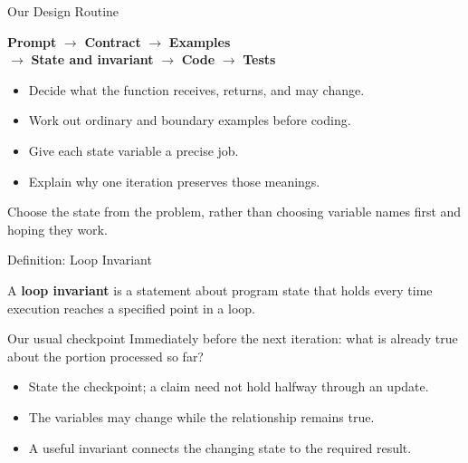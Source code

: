 \documentclass[aspectratio=169,10pt]{beamer}
\begin{document}
\begin{frame}{Our Design Routine}
\small
\begin{center}
\textbf{Prompt} $\longrightarrow$ \textbf{Contract} $\longrightarrow$ \textbf{Examples}\\[8pt]
$\longrightarrow$ \textbf{State and invariant} $\longrightarrow$ \textbf{Code} $\longrightarrow$ \textbf{Tests}
\end{center}
\begin{itemize}
 \item Decide what the function receives, returns, and may change.
 \item Work out ordinary and boundary examples before coding.
 \item Give each state variable a precise job.
 \item Explain why one iteration preserves those meanings.
\end{itemize}
\begin{keyidea}Choose the state from the problem, rather than choosing variable names first and hoping they work.\end{keyidea}
\end{frame}


\begin{frame}{Definition: Loop Invariant}
\small
\begin{cpdefinition}
A \textbf{loop invariant} is a statement about program state that holds every time execution reaches a specified point in a loop.
\end{cpdefinition}
\begin{block}{Our usual checkpoint}
Immediately before the next iteration: what is already true about the portion processed so far?
\end{block}
\begin{itemize}
 \item State the checkpoint; a claim need not hold halfway through an update.
 \item The variables may change while the relationship remains true.
 \item A useful invariant connects the changing state to the required result.
\end{itemize}
\end{frame}
\end{document}
